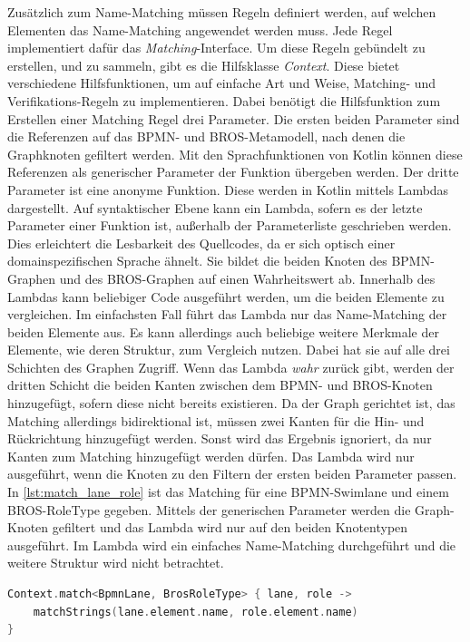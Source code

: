 Zusätzlich zum Name-Matching müssen Regeln definiert werden, auf welchen Elementen das Name-Matching angewendet werden muss.
Jede Regel implementiert dafür das \emph{Matching}-Interface.
Um diese Regeln gebündelt zu erstellen, und zu sammeln, gibt es die Hilfsklasse \emph{Context}.
Diese bietet verschiedene Hilfsfunktionen, um auf einfache Art und Weise, Matching- und Verifikations-Regeln zu implementieren.
Dabei benötigt die Hilfsfunktion zum Erstellen einer Matching Regel drei Parameter.
Die ersten beiden Parameter sind die Referenzen auf das BPMN- und BROS-Metamodell, nach denen die Graphknoten gefiltert werden.
Mit den Sprachfunktionen von Kotlin können diese Referenzen als generischer Parameter der Funktion übergeben werden.
Der dritte Parameter ist eine anonyme Funktion.
Diese werden in Kotlin mittels Lambdas dargestellt.
Auf syntaktischer Ebene kann ein Lambda, sofern es der letzte Parameter einer Funktion ist, außerhalb der Parameterliste geschrieben werden.
Dies erleichtert die Lesbarkeit des Quellcodes, da er sich optisch einer domainspezifischen Sprache ähnelt.
Sie bildet die beiden Knoten des BPMN-Graphen und des BROS-Graphen auf einen Wahrheitswert ab.
Innerhalb des Lambdas kann beliebiger Code ausgeführt werden, um die beiden Elemente zu vergleichen.
Im einfachsten Fall führt das Lambda nur das Name-Matching der beiden Elemente aus.
Es kann allerdings auch beliebige weitere Merkmale der Elemente, wie deren Struktur, zum Vergleich nutzen.
Dabei hat sie auf alle drei Schichten des Graphen Zugriff.
Wenn das Lambda \emph{wahr} zurück gibt, werden der dritten Schicht die beiden Kanten zwischen dem BPMN- und BROS-Knoten hinzugefügt, sofern diese nicht bereits existieren.
Da der Graph gerichtet ist, das Matching allerdings bidirektional ist, müssen zwei Kanten für die Hin- und Rückrichtung hinzugefügt werden.
Sonst wird das Ergebnis ignoriert, da nur Kanten zum Matching hinzugefügt werden dürfen.
Das Lambda wird nur ausgeführt, wenn die Knoten zu den Filtern der ersten beiden Parameter passen.
In \cref{lst:match_lane_role} ist das Matching für eine BPMN-Swimlane und einem BROS-RoleType gegeben.
Mittels der generischen Parameter werden die Graph-Knoten gefiltert und das Lambda wird nur auf den beiden Knotentypen ausgeführt. 
Im Lambda wird ein einfaches Name-Matching durchgeführt und die weitere Struktur wird nicht betrachtet.

\begin{lstlisting}[language=Kotlin, caption=Matching Regel von einer BPMN-SwimLane und einem BROS-RoleType, label=lst:match_lane_role]
Context.match<BpmnLane, BrosRoleType> { lane, role ->
    matchStrings(lane.element.name, role.element.name)
}
\end{lstlisting}

